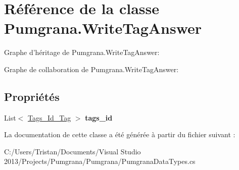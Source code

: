 \hypertarget{class_pumgrana_1_1_write_tag_answer}{\section{Référence de la classe Pumgrana.\+Write\+Tag\+Answer}
\label{class_pumgrana_1_1_write_tag_answer}
}


Graphe d'héritage de Pumgrana.\+Write\+Tag\+Answer\+:


Graphe de collaboration de Pumgrana.\+Write\+Tag\+Answer\+:
\subsection*{Propriétés}
\begin{DoxyCompactItemize}
\item 
\hypertarget{class_pumgrana_1_1_write_tag_answer_a9b4cc8068c52ea0349951587ea1ad849}{List$<$ \hyperlink{class_pumgrana_1_1_tags___id___tag}{Tags\+\_\+\+Id\+\_\+\+Tag} $>$ {\bfseries tags\+\_\+id}}\label{class_pumgrana_1_1_write_tag_answer_a9b4cc8068c52ea0349951587ea1ad849}

\end{DoxyCompactItemize}


La documentation de cette classe a été générée à partir du fichier suivant \+:\begin{DoxyCompactItemize}
\item 
C\+:/\+Users/\+Tristan/\+Documents/\+Visual Studio 2013/\+Projects/\+Pumgrana/\+Pumgrana/Pumgrana\+Data\+Types.\+cs\end{DoxyCompactItemize}
